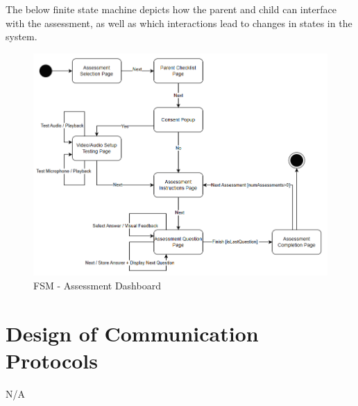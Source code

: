 \documentclass[12pt, titlepage]{article}
\begin{document}
\newpage

\hspace{1.5em}The below finite state machine depicts how the parent and child can interface with the assessment, as well as which interactions lead to changes in states in the system.
\begin{figure}[H]
  \centering
  \includegraphics[scale=0.6]{images/FSM_Assessment.png}
  \caption{FSM - Assessment Dashboard}
\end{figure}

\newpage

\section{Design of Communication Protocols}

N/A
\end{document}

